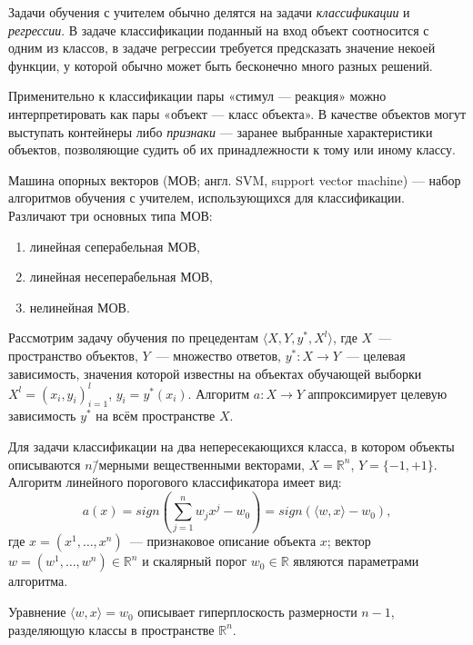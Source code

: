 Задачи обучения с учителем обычно делятся на задачи \textit{классификации} и \textit{регрессии}. В задаче классификации поданный на вход объект соотносится с одним из классов, в задаче регрессии требуется предсказать значение некоей функции, у которой обычно может быть бесконечно много разных решений.

Применительно к классификации пары «стимул --- реакция» можно интерпретировать как пары «объект --- класс объекта». В качестве объектов могут выступать контейнеры либо \textit{признаки} --- заранее выбранные характеристики объектов, позволяющие судить об их принадлежности к тому или иному классу.

Машина опорных векторов (МОВ; англ. SVM, support vector machine) --- набор алгоритмов обучения с учителем, использующихся для классификации. Различают три основных типа МОВ:
\begin{enumerate}
\item линейная сеперабельная МОВ,
\item линейная несеперабельная МОВ,
\item нелинейная МОВ.
\end{enumerate}

Рассмотрим задачу обучения по прецедентам $ \langle X, Y, y^*, X^l \rangle $, где $ X $~--- пространство объектов, $ Y $~--- множество ответов, $ y^*: X \to Y $~--- целевая зависимость, значения которой известны на объектах обучающей выборки $ X^l = (x_i, y_i)_{i = 1}^l $, $ y_i = y^*(x_i) $. Алгоритм $ a: X \to Y $ аппроксимирует целевую зависимость $ y^* $ на всём пространстве $ X $.

Для задачи классификации на два непересекающихся класса, в котором объекты описываются $ n $\=/мерными вещественными векторами, $ X = \mathbb{R}^n $, $ Y = \{-1, +1\} $. Алгоритм линейного порогового классификатора имеет вид:
\begin{equation*}
a(x) = sign(\sum_{j = 1}^n w_j x^j - w_0) = sign(\langle w, x \rangle - w_0),
\end{equation*}
где $ x = (x^1, \ldots, x^n) $~--- признаковое описание объекта $ x $; вектор $ w = (w^1, \ldots, w^n) \in \mathbb{R}^n $ и скалярный порог $ w_0 \in \mathbb{R} $ являются параметрами алгоритма.

Уравнение $ \langle w, x \rangle = w_0 $ описывает гиперплоскость размерности $ n - 1 $, разделяющую классы в пространстве $ \mathbb{R}^n $.

